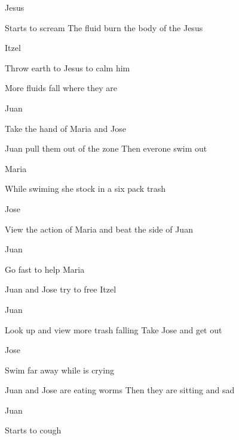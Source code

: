 \documentclass{screenplay}[2012/06/30]
\begin{document}
\begin{dialogue}{Jesus}
\end{dialogue}

Starts to scream
The fluid burn the body of the Jesus

\begin{dialogue}[worried]{Itzel}
\end{dialogue}

Throw earth to Jesus to calm him

More fluids fall where they are

\begin{dialogue}[worried]{Juan}
\end{dialogue}

Take the hand of Maria and Jose

Juan pull them out of the zone
Then everone swim out

\begin{dialogue}[sad]{Maria}
\end{dialogue}

While swiming she stock in a six pack trash 

\begin{dialogue}[worried]{Jose}
\end{dialogue}

View the action of Maria and beat the side of Juan

\begin{dialogue}[amazed]{Juan}
\end{dialogue}

Go fast to help Maria

Juan and Jose try to free Itzel

\begin{dialogue}[worried]{Juan}
\end{dialogue}

Look up and view more trash falling
Take Jose and get out

\begin{dialogue}[sad]{Jose}
\end{dialogue}

Swim far away while is crying

\fadeout
\fadein

Juan and Jose are eating worms
Then they are sitting and sad

\begin{dialogue}[worried]{Juan}
\end{dialogue}

Starts to cough
\end{document}
